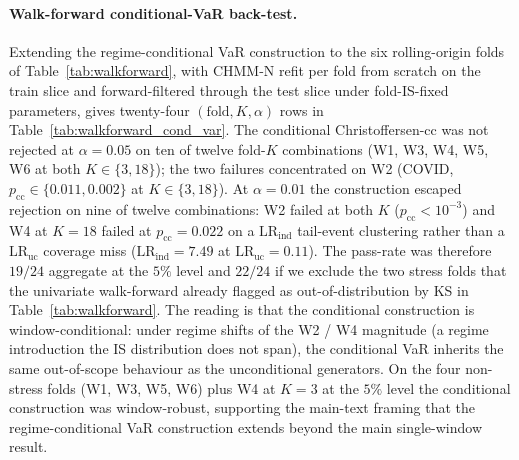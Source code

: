 \paragraph{Walk-forward conditional-VaR back-test.}
Extending the regime-conditional VaR construction to the six rolling-origin folds of Table~\ref{tab:walkforward}, with CHMM-N refit per fold from scratch on the train slice and forward-filtered through the test slice under fold-IS-fixed parameters, gives twenty-four $(\text{fold}, K, \alpha)$ rows in Table~\ref{tab:walkforward_cond_var}.
The conditional Christoffersen-cc was not rejected at $\alpha = 0.05$ on ten of twelve fold-$K$ combinations (W1, W3, W4, W5, W6 at both $K \in \{3, 18\}$); the two failures concentrated on W2 (COVID, $p_{\text{cc}} \in \{0.011, 0.002\}$ at $K \in \{3, 18\}$).
At $\alpha = 0.01$ the construction escaped rejection on nine of twelve combinations: W2 failed at both $K$ ($p_{\text{cc}} < 10^{-3}$) and W4 at $K = 18$ failed at $p_{\text{cc}} = 0.022$ on a $\text{LR}_{\text{ind}}$ tail-event clustering rather than a $\text{LR}_{\text{uc}}$ coverage miss ($\text{LR}_{\text{ind}} = 7.49$ at $\text{LR}_{\text{uc}} = 0.11$).
The pass-rate was therefore $19/24$ aggregate at the $5\%$ level and $22/24$ if we exclude the two stress folds that the univariate walk-forward already flagged as out-of-distribution by KS in Table~\ref{tab:walkforward}.
The reading is that the conditional construction is window-conditional: under regime shifts of the W2 / W4 magnitude (a regime introduction the IS distribution does not span), the conditional VaR inherits the same out-of-scope behaviour as the unconditional generators.
On the four non-stress folds (W1, W3, W5, W6) plus W4 at $K = 3$ at the $5\%$ level the conditional construction was window-robust, supporting the main-text framing that the regime-conditional VaR construction extends beyond the main single-window result.

